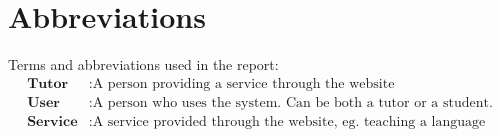 \chapter*{Abbreviations}
Terms and abbreviations used in the report:
\begin{align*}
    \textbf{Tutor} &: \text{A person providing a service through the website} \\
    \textbf{User} &: \text{A person who uses the system. Can be both a tutor or a student.} \\
    \textbf{Service} &: \text{A service provided through the website, eg. teaching a language} \\
\end{align*}
